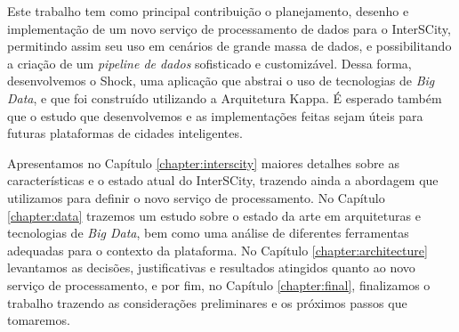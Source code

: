 Este trabalho tem como principal contribuição o planejamento, desenho e
implementação de um novo serviço de processamento de dados para o InterSCity,
permitindo assim seu uso em cenários de grande massa de dados, e possibilitando
a criação de um \textit{pipeline de dados} sofisticado e customizável. Dessa
forma, desenvolvemos o Shock, uma aplicação que abstrai o uso de tecnologias
de \textit{Big Data}, e que foi construído utilizando a Arquitetura Kappa. É
esperado também que o estudo que desenvolvemos e as implementações feitas
sejam úteis para futuras plataformas de cidades inteligentes.

Apresentamos no Capítulo \ref{chapter:interscity} maiores detalhes sobre as
características e o estado atual do InterSCity, trazendo ainda a abordagem que
utilizamos para definir o novo serviço de processamento. No Capítulo
\ref{chapter:data} trazemos um estudo sobre o estado da arte em arquiteturas e
tecnologias de \textit{Big Data}, bem como uma análise de diferentes ferramentas
adequadas para o contexto da plataforma. No Capítulo \ref{chapter:architecture}
levantamos as decisões, justificativas e resultados atingidos quanto ao novo
serviço de processamento, e por fim, no Capítulo \ref{chapter:final},
finalizamos o trabalho trazendo as considerações preliminares e os próximos
passos que tomaremos.
